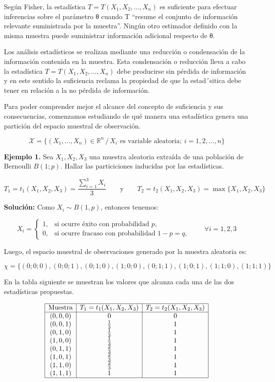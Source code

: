 \documentclass[
  11pt,
]{report}
\begin{document}
\hfill\break
Según Fisher, la estadística \(T = T(X_1, X_2, \ldots, X_n)\) es
suficiente para efectuar inferencias sobre el parámetro θ cuando T
``resume el conjunto de información relevante suministrada por la
muestra''. Ningún otro estimador definido con la misma muestra puede
suministrar información adicional respecto de θ.

\hfill\break
Los análisis estadísticos se realizan mediante una reducción o
condensación de la información contenida en la muestra. Esta
condensación o reducción lleva a cabo la estadística
\(T = T(X_1, X_2, \ldots, X_n)\) debe producirse sin pérdida de
información y en este sentido la suficiencia reclama la propiedad de que
la estad´sitica debe tener en relación a la no pérdida de información.

Para poder comprender mejor el alcance del concepto de suficiencia y sus
consecuencias, comenzamos estudiando de qué manera una estadística
genera una partición del espacio muestral de observación.

\[\mathcal{X}=\{(X_1,\ldots,X_n)\in \mathbb{R}^n \,/\, X_i \text{ es variable aleatoria};\ i=1,2,\ldots,n\}\]

\textbf{Ejemplo 1.} Sea \(X_1, X_2, X_3\) una muestra aleatoria extraída
de una población de Bernoulli \(B(1;p)\). Hallar las particiciones
inducidas por las estadísticas.

\[T_1=t_1(X_1,X_2,X_3)=\frac{\sum_{i=1}^{3} X_i}{3}
\qquad \text{y} \qquad
T_2=t_2(X_1,X_2,X_3)=\max\{X_1,X_2,X_3\}\]

\textbf{Solución:} Como \(X_i \sim B(1,p)\), entonces tenemos:

\[X_i=
\begin{cases}
1, & \text{si ocurre éxito con probabilidad } p,\\
0, & \text{si ocurre fracaso con probabilidad } 1-p=q,
\end{cases}
\qquad \forall i=1,2,3\]

Luego, el espacio muestral de observaciones generado por la muestra
aleatoria es:

\[\chi = \{(0;0;0), (0;0;1), (0;1;0), (1;0;0), (0;1;1), (1;0;1), (1;1;0), (1;1;1)\}\]

En la tabla siguiente se muestran los valores que alcanza cada una de
las dos estadísticas propuestas.

\[\begin{array}{|c|c|c|}
\hline
\text{Muestra} & T_1=t_1(X_1,X_2,X_3) & T_2=t_2(X_1,X_2,X_3) \\
\hline
(0,0,0) & 0 & 0 \\
(0,0,1) & \frac{1}{3} & 1 \\
(0,1,0) & \frac{1}{3} & 1 \\
(1,0,0) & \frac{1}{3} & 1 \\
(0,1,1) & \frac{2}{3} & 1 \\
(1,0,1) & \frac{2}{3} & 1 \\
(1,1,0) & \frac{2}{3} & 1 \\
(1,1,1) & 1 & 1 \\
\hline
\end{array}\]
\end{document}
